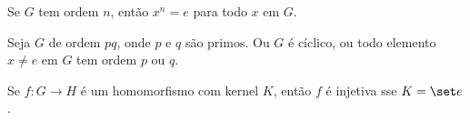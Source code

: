 \begin{exercise}
	Se $G$ tem ordem $n$, então $x^n = e$ para todo $x$ em $G$.
\end{exercise}

\begin{exercise}
	Seja $G$ de ordem $pq$, onde $p$ e $q$ são primos. Ou $G$ é cíclico, ou todo elemento $x \neq e$ em $G$ tem ordem $p$ ou $q$.
\end{exercise}

\begin{exercise}
	Se $f:G \to H$ é um homomorfismo com kernel $K$, então $f$ é injetiva sse $K = \set e$.
\end{exercise}

